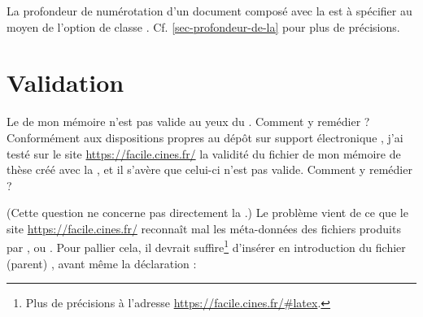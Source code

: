 La profondeur de numérotation d'un document composé avec la \yatCl{} est
à spécifier au moyen de l'option de classe
. Cf. \vref{sec-profondeur-de-la} pour plus de précisions.

\section{Validation}
\label{sec-validation}

\begin{dbfaq}{Le  de mon mémoire n'est pas valide au yeux du
    . Comment y remédier ?}{}
   
  Conformément aux dispositions propres au dépôt sur support électronique
  \autocite{guidoct-abes}, j'ai testé sur le site \url{https://facile.cines.fr/}
  la validité du fichier  de mon mémoire de thèse créé avec la
  \yatCl{}, et il s'avère que celui-ci n'est pas valide. Comment y remédier ?
\end{dbfaq}

(Cette question ne concerne pas directement la \yatCl{}.) Le problème
vient de ce que le site \url{https://facile.cines.fr/} reconnaît mal les
méta-données des fichiers  produits par ,
 ou .
Pour pallier cela, il devrait suffire\footnote{Plus de précisions à l'adresse
  \url{https://facile.cines.fr/\#latex}.} d'insérer en introduction du fichier
(parent) , avant même la déclaration  :
\begin{preamblecode}
\end{preamblecode}

